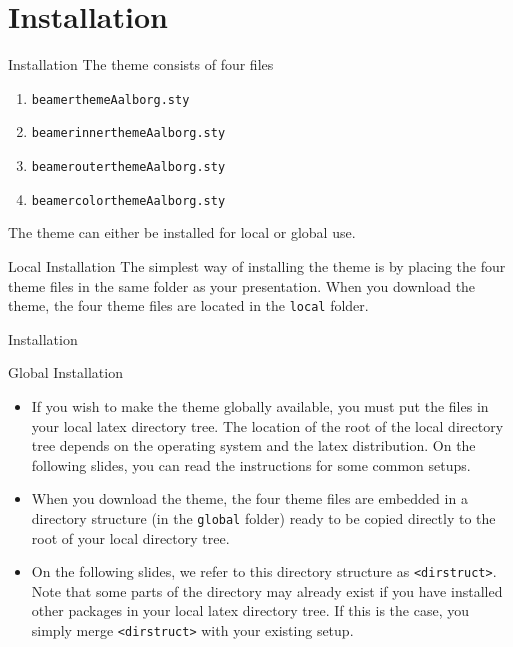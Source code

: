 \documentclass[10pt]{beamer}
\begin{document}
\section{Installation}
\begin{frame}{Installation}
  The theme consists of four files
  \begin{enumerate}
    \item {\tt beamerthemeAalborg.sty}
    \item {\tt beamerinnerthemeAalborg.sty}
    \item {\tt beamerouterthemeAalborg.sty}
    \item {\tt beamercolorthemeAalborg.sty}
  \end{enumerate}
  The theme can either be installed for local or global use.
  \pause
  \begin{block}{Local Installation}
    The simplest way of installing the theme is by placing the four theme files in the same folder as your presentation. When you download the theme, the four theme files are located in the {\tt local} folder.
  \end{block}
\end{frame}

\begin{frame}{Installation}
  \begin{block}{Global Installation}
  \begin{itemize}
     \item If you wish to make the theme globally available, you must put the files in your local latex directory tree. The location of the root of the local directory tree depends on the operating system and the latex distribution. On the following slides, you can read the instructions for some common setups.
    \item When you download the theme, the four theme files are embedded in a directory structure (in the {\tt global} folder) ready to be copied directly to the root of your local directory tree.
    \item On the following slides, we refer to this directory structure as {\tt <dirstruct>}. \alert{Note} that some parts of the directory may already exist if you have installed other packages in your local latex directory tree. If this is the case, you simply merge {\tt <dirstruct>} with your existing setup.
  \end{itemize}
  \end{block}
\end{frame}
\end{document}
